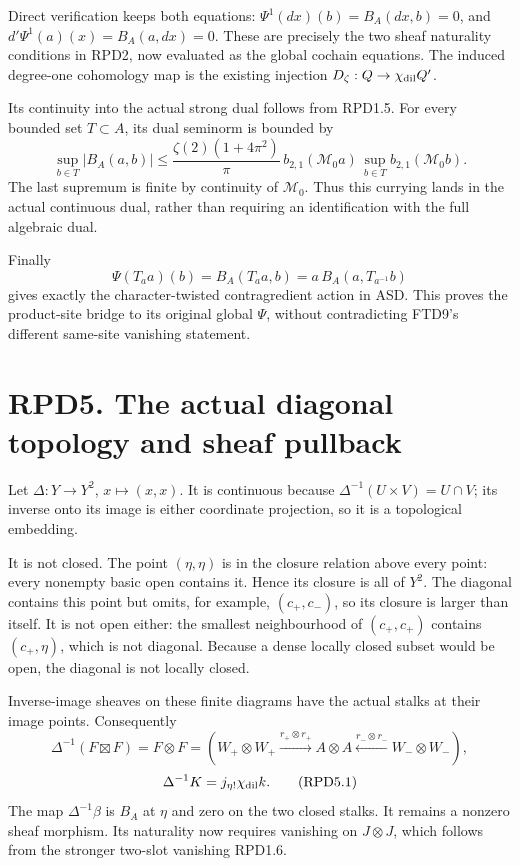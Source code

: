 Direct verification keeps both equations: \(\Psi^1(dx)(b)=B_A(dx,b)=0\),
and \(d'\Psi^1(a)(x)=B_A(a,dx)=0\). These are precisely the two sheaf
naturality conditions in RPD2, now evaluated as the global cochain
equations. The induced degree-one cohomology map is the existing
injection \(D_\zeta:Q\to\chi_{\rm dil}Q'\).

Its continuity into the actual strong dual follows from RPD1.5. For
every bounded set \(T\subset A\), its dual seminorm is bounded by \[
\sup_{b\in T}|B_A(a,b)|
\le\frac{\zeta(2)(1+4\pi^2)}{\pi}
\,b_{2,1}(\mathcal M_0a)\,
\sup_{b\in T}b_{2,1}(\mathcal M_0b).
\] The last supremum is finite by continuity of \(\mathcal M_0\). Thus
this currying lands in the actual continuous dual, rather than requiring
an identification with the full algebraic dual.

Finally \[
\Psi(T_aa)(b)=B_A(T_aa,b)
=a\,B_A(a,T_{a^{-1}}b)
\] gives exactly the character-twisted contragredient action in ASD.
This proves the product-site bridge to its original global \(\Psi\),
without contradicting FTD9's different same-site vanishing statement.

\section{RPD5. The actual diagonal topology and sheaf
pullback}\label{rpd5.-the-actual-diagonal-topology-and-sheaf-pullback}

Let \(\Delta:Y\to Y^2\), \(x\mapsto(x,x)\). It is continuous because
\(\Delta^{-1}(U\times V)=U\cap V\); its inverse onto its image is either
coordinate projection, so it is a topological embedding.

It is not closed. The point \((\eta,\eta)\) is in the closure relation
above every point: every nonempty basic open contains it. Hence its
closure is all of \(Y^2\). The diagonal contains this point but omits,
for example, \((c_+,c_-)\), so its closure is larger than itself. It is
not open either: the smallest neighbourhood of \((c_+,c_+)\) contains
\((c_+,\eta)\), which is not diagonal. Because a dense locally closed
subset would be open, the diagonal is not locally closed.

Inverse-image sheaves on these finite diagrams have the actual stalks at
their image points. Consequently \[
\Delta^{-1}(F\boxtimes F)=F\otimes F
=(W_+\otimes W_+\xrightarrow{r_+\otimes r_+}A\otimes A
\xleftarrow{r_-\otimes r_-}W_-\otimes W_-),
\] \[
\Delta^{-1}K=j_{\eta!}\chi_{\rm dil}k.
\tag{RPD5.1}
\] The map \(\Delta^{-1}\beta\) is \(B_A\) at \(\eta\) and zero on the
two closed stalks. It remains a nonzero sheaf morphism. Its naturality
now requires vanishing on \(J\otimes J\), which follows from the
stronger two-slot vanishing RPD1.6.

